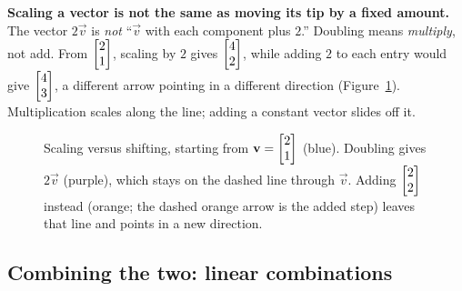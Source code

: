 \begin{trapbox}
\textbf{Scaling a vector is not the same as moving its tip by a fixed amount.} The vector
$2\vec{v}$ is \emph{not} ``$\vec{v}$ with each component plus $2$.'' Doubling means
\emph{multiply}, not add. From $\begin{bmatrix}2\\1\end{bmatrix}$, scaling by $2$ gives $\begin{bmatrix}4\\2\end{bmatrix}$,
while adding $2$ to each entry would give $\begin{bmatrix}4\\3\end{bmatrix}$, a different arrow pointing in a
different direction (Figure~\ref{ch02:fig-scale-shift}). Multiplication scales along the
line; adding a constant vector slides off it.
\end{trapbox}

\begin{figure}[htbp]
\centering
{}
\caption{Scaling versus shifting, starting from $\mathbf{v}=\begin{bmatrix}2\\1\end{bmatrix}$ (blue). Doubling
gives $2\vec{v}$ (purple), which stays on the dashed line through $\vec{v}$. Adding
$\begin{bmatrix}2\\2\end{bmatrix}$ instead (orange; the dashed orange arrow is the added step) leaves that
line and points in a new direction.}
\label{ch02:fig-scale-shift}
\end{figure}

\subsection*{Combining the two: linear combinations}

